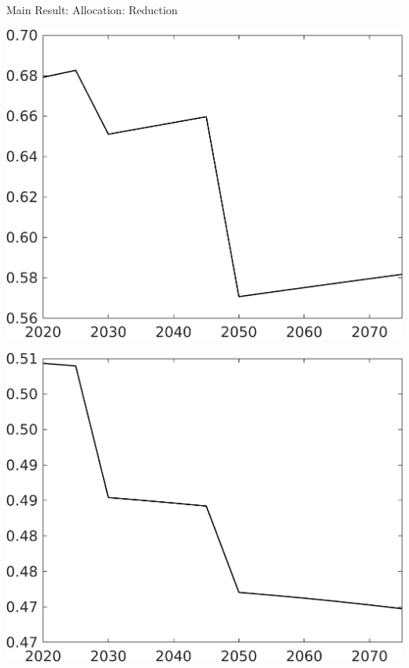 \documentclass[11pt,aspectratio=169]{beamer}
\begin{document}
\begin{frame}{Main Result: Allocation: Reduction}
	\centering
\begin{minipage}[]{0.32\textwidth}
	\includegraphics[width=1\textwidth]{../codding_model/own_basedOnFried/optimalPol_elastS_DisuSci/figures/all_1705/Single_OPT_T_NoTaus_C_spillover0_sep1_BN0_ineq0_red0_etaa0.79.png}
\end{minipage}
	\begin{minipage}[]{0.32\textwidth}
		\includegraphics[width=1\textwidth]{../codding_model/own_basedOnFried/optimalPol_elastS_DisuSci/figures/all_1705/Single_OPT_T_NoTaus_hh_spillover0_sep1_BN0_ineq0_red0_etaa0.79.png}

\end{minipage}
\end{frame}
\end{document}
